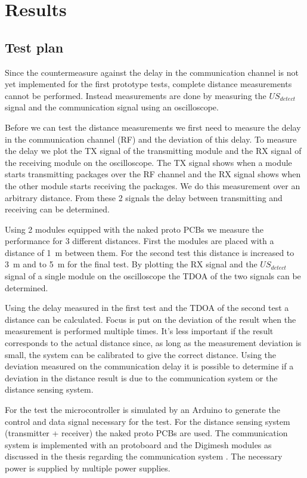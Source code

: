 \chapter{Results}
\label{chap:results}

\section{Test plan}
\label{sec:testplan}
Since the countermeasure against the delay in the communication channel is not yet implemented for the first prototype tests, complete distance measurements cannot be performed.
Instead measurements are done by measuring the $US_{detect}$ signal and the communication signal using an oscilloscope.

Before we can test the distance measurements we first need to measure the delay in the communication channel (RF) and the deviation of this delay.
To measure the delay we plot the TX signal of the transmitting module and the RX signal of the receiving module on the oscilloscope.
The TX signal shows when a module starts transmitting packages over the RF channel and the RX signal shows when the other module starts receiving the packages.
We do this measurement over an arbitrary distance.
From these 2 signals the delay between transmitting and receiving can be determined.

Using 2 modules equipped with the naked proto PCBs we measure the performance for 3 different distances.
First the modules are placed with a distance of \SI{1}{\meter} between them.
For the second test this distance is increased to \SI{3}{\meter} and to \SI{5}{\meter} for the final test.
By plotting the RX signal and the $US_{detect}$ signal of a single module on the oscilloscope the TDOA of the two signals can be determined.

Using the delay measured in the first test and the TDOA of the second test a distance can be calculated.
Focus is put on the deviation of the result when the measurement is performed multiple times.
It's less important if the result corresponds to the actual distance since, as long as the measurement deviation is small, the system can be calibrated to give the correct distance.
Using the deviation measured on the communication delay it is possible to determine if a deviation in the distance result is due to the communication system or the distance sensing system.

For the test the microcontroller is simulated by an Arduino to generate the control and data signal necessary for the test.
For the distance sensing system (transmitter + receiver) the naked proto PCBs are used.
The communication system is implemented with an protoboard and the Digimesh modules as discussed in the thesis regarding the communication system \cite{communication}.
The necessary power is supplied by multiple power supplies.

